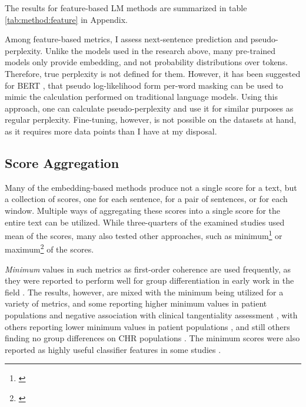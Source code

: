 The results for feature-based LM methods are summarized in table \ref{tab:method:feature} in Appendix. 

Among feature-based metrics, I assess next-sentence prediction and pseudo-perplexity. Unlike the models used in the research above, many pre-trained models only provide embedding, and not probability distributions over tokens. Therefore, true perplexity is not defined for them. However, it has been suggested for BERT \citep{wang2019bert}, that pseudo log-likelihood form per-word masking can be used to mimic the calculation performed on traditional language models. Using this approach, one can calculate pseudo-perplexity and use it for similar purposes as regular perplexity. Fine-tuning, however, is not possible on the datasets at hand, as it requires more data points than I have at my disposal.

\subsection{Score Aggregation}
\label{sec:review:LM:agrregation}
Many of the embedding-based methods produce not a single score for a text, but a collection of scores, one for each sentence, for a pair of sentences, or for each window. Multiple ways of aggregating these scores into a single score for the entire text can be utilized. While three-quarters of the examined studies used mean of the scores, many also tested other approaches, such as minimum\footnote{\cite{bedi2015automated, iter2018automatic, corcoran2018prediction, panicheva2019semantic, haas2020linking, ryazanskaya2020thesis, xu2020centroid, morgan2021natural, sarzynska2021detecting, voppel2021quantified, bilgrami2022construct, corona2022assessing, xu2022fully, voppel2023semantic}} or maximum\footnote{\cite{corcoran2018prediction, panicheva2019semantic, haas2020linking, ryazanskaya2020thesis, morgan2021natural, bilgrami2022construct, corona2022assessing, voppel2023semantic}} of the scores. 

\textit{Minimum} values in such metrics as first-order coherence are used frequently, as they were reported to perform well for group differentiation in early work in the field \citep{bedi2015automated}. The results, however, are mixed with the minimum being utilized for a variety of metrics, and some reporting higher minimum values in patient populations \citep{panicheva2019semantic, corona2022assessing} and negative association with clinical tangentiality assessment \citep{bilgrami2022construct}, with others reporting lower minimum values in patient populations \citep{bedi2015automated, corcoran2018prediction, iter2018automatic, ryazanskaya2020automated}, and still others finding no group differences on CHR populations \citep{haas2020linking, bilgrami2022construct}. The minimum scores were also reported as highly useful classifier features in some studies \citep{bedi2015automated, xu2020centroid, xu2022fully, sarzynska2021detecting}.

